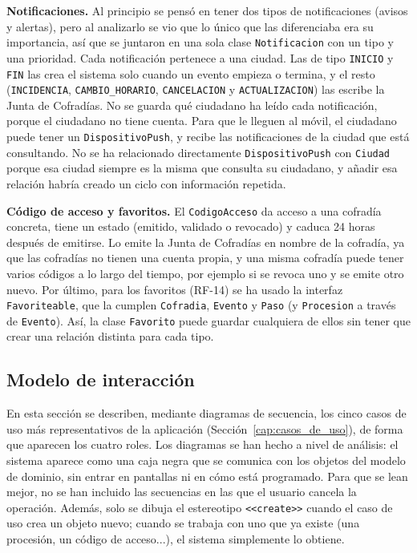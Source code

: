 \textbf{Notificaciones.} Al principio se pensó en tener dos tipos de notificaciones (avisos y alertas), pero al analizarlo se vio que lo único que las diferenciaba era su importancia, así que se juntaron en una sola clase \texttt{Notificacion} con un tipo y una prioridad. Cada notificación pertenece a una ciudad. Las de tipo \texttt{INICIO} y \texttt{FIN} las crea el sistema solo cuando un evento empieza o termina, y el resto (\texttt{INCIDENCIA}, \texttt{CAMBIO\_HORARIO}, \texttt{CANCELACION} y \texttt{ACTUALIZACION}) las escribe la Junta de Cofradías. No se guarda qué ciudadano ha leído cada notificación, porque el ciudadano no tiene cuenta. Para que le lleguen al móvil, el ciudadano puede tener un \texttt{DispositivoPush}, y recibe las notificaciones de la ciudad que está consultando. No se ha relacionado directamente \texttt{DispositivoPush} con \texttt{Ciudad} porque esa ciudad siempre es la misma que consulta su ciudadano, y añadir esa relación habría creado un ciclo con información repetida.

\textbf{Código de acceso y favoritos.} El \texttt{CodigoAcceso} da acceso a una cofradía concreta, tiene un estado (emitido, validado o revocado) y caduca 24 horas después de emitirse. Lo emite la Junta de Cofradías en nombre de la cofradía, ya que las cofradías no tienen una cuenta propia, y una misma cofradía puede tener varios códigos a lo largo del tiempo, por ejemplo si se revoca uno y se emite otro nuevo. Por último, para los favoritos (RF-14) se ha usado la interfaz \texttt{Favoriteable}, que la cumplen \texttt{Cofradia}, \texttt{Evento} y \texttt{Paso} (y \texttt{Procesion} a través de \texttt{Evento}). Así, la clase \texttt{Favorito} puede guardar cualquiera de ellos sin tener que crear una relación distinta para cada tipo.

\subsection{Modelo de interacción}\label{cap:modeloInteraccion}

En esta sección se describen, mediante diagramas de secuencia, los cinco casos de uso más representativos de la aplicación (Sección~\ref{cap:casos_de_uso}), de forma que aparecen los cuatro roles. Los diagramas se han hecho a nivel de análisis: el sistema aparece como una caja negra que se comunica con los objetos del modelo de dominio, sin entrar en pantallas ni en cómo está programado. Para que se lean mejor, no se han incluido las secuencias en las que el usuario cancela la operación. Además, solo se dibuja el estereotipo \texttt{<<create>>} cuando el caso de uso crea un objeto nuevo; cuando se trabaja con uno que ya existe (una procesión, un código de acceso...), el sistema simplemente lo obtiene.

